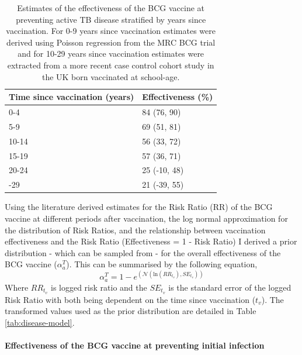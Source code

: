 \documentclass[11pt,twoside]{bristolthesis}
\begin{document}
  \begin{table}[!h]
  
  \caption[Estimates of the effectiveness of the BCG vaccine at preventing active TB disease stratified by years since vaccination.]{\label{tab:bcg-eff-est}Estimates of the effectiveness of the BCG vaccine at preventing active TB disease stratified by years since vaccination. For 0-9 years since vaccination estimates were derived using Poisson regression from the MRC BCG trial and for 10-29 years since vaccination estimates were extracted from a more recent case control cohort study in the UK born vaccinated at school-age.}
  \centering
  \begin{tabular}{ll}
  \toprule
  Time since vaccination (years) & Effectiveness (\%)\\
  \midrule
  0-4 & 84 (76, 90)\\
  5-9 & 69 (51, 81)\\
  10-14 & 56 (33, 72)\\
  15-19 & 57 (36, 71)\\
  20-24 & 25 (-10, 48)\\
  \addlinespace
  25-29 & 21 (-39, 55)\\
  \bottomrule
  \end{tabular}
  \end{table}
  Using the literature derived estimates for the Risk Ratio (RR) of the BCG vaccine at different periods after vaccination, the log normal approximation for the distribution of Risk Ratios, and the relationship between vaccination effectiveness and the Risk Ratio (Effectiveness = 1 - Risk Ratio) I derived a prior distribution - which can be sampled from - for the overall effectiveness of the BCG vaccine (\(\alpha^T_a\)). This can be summarised by the following equation,
  \begin{equation}
    \alpha^T_a = 1 - e^{\left(\mathcal{N}(\text{ln}(RR_{t_v}), SE_{t_v})\right)}
    \label{eq:rr-to-alpha}
  \end{equation}
  Where \(RR_{t_v}\) is logged risk ratio and the \(SE_{t_v}\) is the standard error of the logged Risk Ratio with both being dependent on the time since vaccination (\(t_v\)). The transformed values used as the prior distribution are detailed in Table \ref{tab:disease-model}.
  
  \hypertarget{effectiveness-of-the-bcg-vaccine-at-preventing-initial-infection}{%
  \paragraph{Effectiveness of the BCG vaccine at preventing initial infection}\label{effectiveness-of-the-bcg-vaccine-at-preventing-initial-infection}}
  
\end{document}
